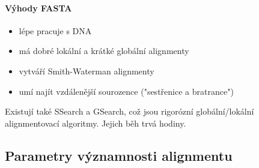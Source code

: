 \documentclass[DIV=8]{scrreprt}
\begin{document}
\paragraph{Výhody FASTA}
\begin{itemize}[nosep]
    \item lépe pracuje s DNA
    \item má dobré lokální a krátké globální alignmenty
    \item vytváří Smith-Waterman alignmenty
    \item umí najít vzdálenější sourozence ("sestřenice a bratrance")
\end{itemize}



Existují také SSearch a GSearch, což jsou rigorózní globální/lokální alignmentovací algoritmy. Jejich běh trvá hodiny.

\subsection{Parametry významnosti alignmentu} \label{Parametry významnosti alignmentu}
\end{document}
